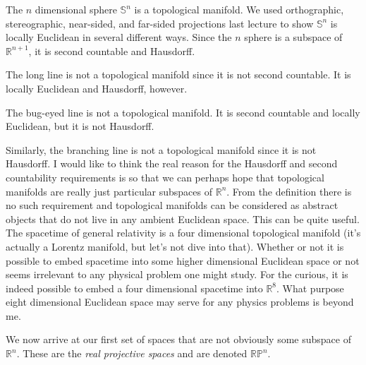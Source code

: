 \documentclass{article}
\theoremstyle{plain}
\theoremstyle{normal}
\newenvironment{example}{%
    \pushQED{\qed}\renewcommand{\qedsymbol}{$\blacksquare$}\examplex%
}{%
    \popQED\endexamplex%
}
\begin{document}
        \begin{example}
            The $n$ dimensional sphere $\mathbb{S}^{n}$ is a topological
            manifold. We used orthographic, stereographic, near-sided, and
            far-sided projections last lecture to show $\mathbb{S}^{n}$ is
            locally Euclidean in several different ways. Since the $n$ sphere
            is a subspace of $\mathbb{R}^{n+1}$, it is second countable and
            Hausdorff.
        \end{example}
        \begin{example}
            The long line is not a topological manifold since it is not
            second countable. It is locally Euclidean and Hausdorff, however.
        \end{example}
        \begin{example}
            The bug-eyed line is not a topological manifold. It is second
            countable and locally Euclidean, but it is not Hausdorff.
        \end{example}
        \begin{example}
            Similarly, the branching line is not a topological manifold since it
            is not Hausdorff.
        \end{example}
        I would like to think the real reason for the Hausdorff and second
        countability requirements is so that we can perhaps hope that
        topological manifolds are really just particular subspaces of
        $\mathbb{R}^{n}$. From the definition there is no such requirement and
        topological manifolds can be considered as abstract objects that do not
        live in any ambient Euclidean space. This can be quite useful. The
        spacetime of general relativity is a four dimensional topological
        manifold (it's actually a Lorentz manifold, but let's not dive into
        that). Whether or not it is possible to embed spacetime into some
        higher dimensional Euclidean space or not seems irrelevant to any
        physical problem one might study. For the curious, it is indeed
        possible to embed a four dimensional spacetime into $\mathbb{R}^{8}$.
        What purpose eight dimensional Euclidean space may serve for any
        physics problems is beyond me.
        \par\hfill\par
        We now arrive at our first set of spaces that are not obviously some
        subspace of $\mathbb{R}^{n}$. These are the
        \textit{real projective spaces} and are denoted $\mathbb{RP}^{n}$.
\end{document}
